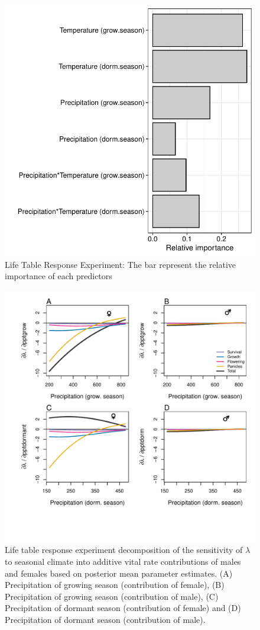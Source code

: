 \documentclass[12pt]{article}
\begin{document}
\begin{figure}[H]
  \begin{center}
    \includegraphics[width=0.65\linewidth]{Figures/Fig_LTRE.pdf}
  \caption{Life Table Response Experiment: The bar represent the relative importance of each predictors}
  \label{Sup:LTRE}
  \end{center}
\end{figure}

\begin{figure}[H]
  \begin{center}
    \includegraphics[width=0.98\linewidth]{Figures/LTRE_Precipitation.pdf}
  \caption{Life table response experiment decomposition of the sensitivity of $\lambda$ to seasonal climate into additive vital rate contributions of males and females based on posterior mean parameter estimates.
 (A) Precipitation of growing season (contribution of female), (B) Precipitation of growing season (contribution of male),  (C) Precipitation of dormant season (contribution of female) and (D) Precipitation of dormant season (contribution of male).}
  \label{Sup:LTRE_precip}
  \end{center}
\end{figure}
\end{document}
